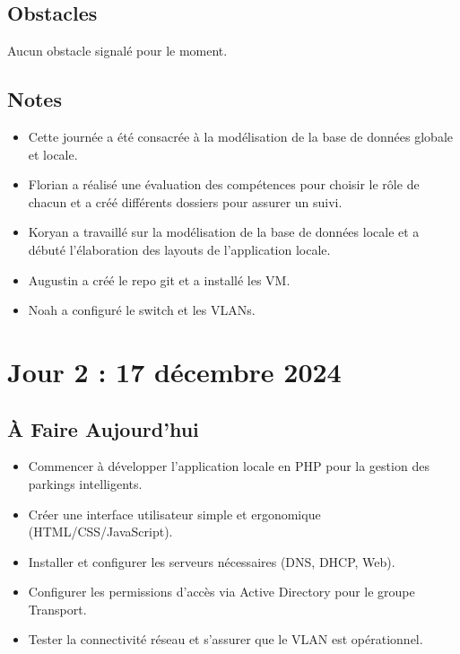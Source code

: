 \documentclass[a4paper,12pt]{report}
\begin{document}
\subsection{Obstacles}
Aucun obstacle signalé pour le moment.

\subsection{Notes}
\begin{itemize}
    \item Cette journée a été consacrée à la modélisation de la base de données globale et locale.
    \item Florian a réalisé une évaluation des compétences pour choisir le rôle de chacun et a créé différents dossiers pour assurer un suivi.
    \item Koryan a travaillé sur la modélisation de la base de données locale et a débuté l’élaboration des layouts de l’application locale.
    \item Augustin a créé le repo git et a installé les VM.
    \item Noah a configuré le switch et les VLANs.
\end{itemize}

\section{Jour 2 : 17 décembre 2024}

\subsection{À Faire Aujourd'hui}
\begin{itemize}
    \item Commencer à développer l'application locale en PHP pour la gestion des parkings intelligents.
    \item Créer une interface utilisateur simple et ergonomique (HTML/CSS/JavaScript).
    \item Installer et configurer les serveurs nécessaires (DNS, DHCP, Web).
    \item Configurer les permissions d'accès via Active Directory pour le groupe Transport.
    \item Tester la connectivité réseau et s'assurer que le VLAN est opérationnel.
\end{itemize}
\end{document}

